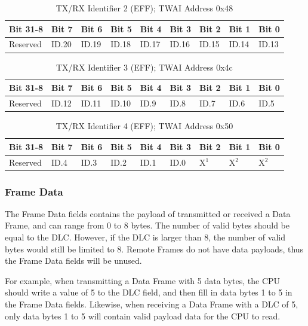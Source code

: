 \documentclass[main\_\_EN.tex]{subfiles}
\begin{document}
\begin{longtable}[c]{|p{1.4cm}|p{1.4cm}|p{1.4cm}|p{1.4cm}|p{1.4cm}|p{1.4cm}|p{1.4cm}|p{1.4cm}|p{1.4cm}|}
    \caption{TX/RX Identifier 2 (EFF); TWAI Address 0x48}
    \label{table:tx_id2_eff}\\
    \hline
       \rowcolor{lightgray}
    Bit 31-8 & Bit 7 & Bit 6 & Bit 5 & Bit 4 & Bit 3 & Bit 2 & Bit 1 & Bit 0\\
    \hline
    Reserved & ID.20 & ID.19 & ID.18 & ID.17 & ID.16 & ID.15 & ID.14 & ID.13\\
    \hline
\end{longtable}

\begin{longtable}[c]{|p{1.4cm}|p{1.4cm}|p{1.4cm}|p{1.4cm}|p{1.4cm}|p{1.4cm}|p{1.4cm}|p{1.4cm}|p{1.4cm}|}
    \caption{TX/RX Identifier 3 (EFF); TWAI Address 0x4c}
    \label{table:tx_id3_eff}\\
    \hline
       \rowcolor{lightgray}
    Bit 31-8 & Bit 7 & Bit 6 & Bit 5 & Bit 4 & Bit 3 & Bit 2 & Bit 1 & Bit 0\\
    \hline
    Reserved & ID.12 & ID.11 & ID.10 & ID.9 & ID.8 & ID.7 & ID.6 & ID.5\\
    \hline
\end{longtable}

\begin{longtable}[c]{|p{1.4cm}|p{1.4cm}|p{1.4cm}|p{1.4cm}|p{1.4cm}|p{1.4cm}|p{1.4cm}|p{1.4cm}|p{1.4cm}|}
    \caption{TX/RX Identifier 4 (EFF); TWAI Address 0x50}
    \label{table:tx_id4_eff}\\
    \hline
       \rowcolor{lightgray}
    Bit 31-8 & Bit 7 & Bit 6 & Bit 5 & Bit 4 & Bit 3 & Bit 2 & Bit 1 & Bit 0\\
    \hline
    Reserved & ID.4 & ID.3 & ID.2 & ID.1 & ID.0 & X$^1$ & X$^2$ & X$^2$\\
    \hline
\end{longtable}

\subsubsection{Frame Data}
The Frame Data fields contains the payload of transmitted or received a Data Frame, and can range from 0 to 8 bytes. The number of valid bytes should be equal to the DLC. However, if the DLC is larger than 8, the number of valid bytes would still be limited to 8. Remote Frames do not have data payloads, thus the Frame Data fields will be unused.

For example, when transmitting a Data Frame with 5 data bytes, the CPU should write a value of 5 to the DLC field, and then fill in data bytes 1 to 5 in the Frame Data fields. Likewise, when receiving a Data Frame with a DLC of 5, only data bytes 1 to 5 will contain valid payload data for the CPU to read.
\end{document}
